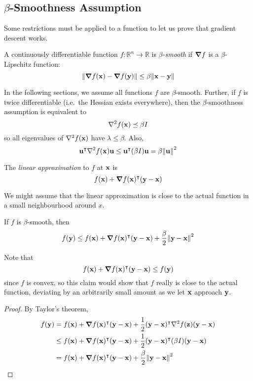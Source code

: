\subsection{\(\beta\)-Smoothness Assumption}
Some restrictions must be applied to a function to let us prove that gradient descent works.
\begin{definition}
	A continuously differentiable function \(f \colon \mathbb R^n \to \mathbb R\) is \textit{\(\beta\)-smooth} if \(\grad{f}\) is a \(\beta\)-Lipschitz function:
	\[
		\norm{\grad{f(\vb x) - \grad{f(\vb y)}}} \leq \beta \norm{\vb x - \vb y}
	\]
\end{definition}
\noindent In the following sections, we assume all functions \(f\) are \(\beta\)-smooth.
Further, if \(f\) is twice differentiable (i.e.\ the Hessian exists everywhere), then the \(\beta\)-smoothness assumption is equivalent to
\[
	\laplacian{f(\vb x)} \preceq \beta I
\]
so all eigenvalues of \(\laplacian{f(\vb x)}\) have \(\lambda \leq \beta\).
Also,
\[
	\vb u^\transpose \laplacian{f(\vb x)} \vb u \leq \vb u^\transpose (\beta I) \vb u = \beta \norm{\vb u}^2
\]
\begin{definition}
	The \textit{linear approximation} to \(f\) at \(\vb x\) is
	\[
		f(\vb x) + \grad{f(\vb x)}^\intercal (\vb y - \vb x)
	\]
\end{definition}
\noindent We might assume that the linear approximation is close to the actual function in a small neighbourhood around \(x\).
\begin{claim}
	If \(f\) is \(\beta\)-smooth, then
	\[
		f(\vb y) \leq f(\vb x) + \grad{f(\vb x)}^\intercal (\vb y - \vb x) + \frac{\beta}{2}\norm{\vb y - \vb x}^2
	\]
\end{claim}
\noindent Note that
\[
	f(\vb x) + \grad{f(\vb x)}^\intercal (\vb y - \vb x) \leq f(\vb y)
\]
since \(f\) is convex, so this claim would show that \(f\) really is close to the actual function, deviating by an arbitrarily small amount as we let \(\vb x\) approach \(\vb y\).
\begin{proof}
	By Taylor's theorem,
	\begin{align*}
		f(\vb y) & = f(\vb x) + \grad{f(\vb x)}^\transpose (\vb y - \vb x) + \frac{1}{2}(\vb y - \vb x)^\transpose \laplacian{f(\vb z)}(\vb y - \vb x) \\
		         & \leq f(\vb x) + \grad{f(\vb x)}^\transpose (\vb y - \vb x) + \frac{1}{2}(\vb y - \vb x)^\transpose (\beta I) (\vb y - \vb x)        \\
		         & = f(\vb x) + \grad{f(\vb x)}^\transpose (\vb y - \vb x) + \frac{\beta}{2}\norm{\vb y - \vb x}^2                                     \\
	\end{align*}
\end{proof}
